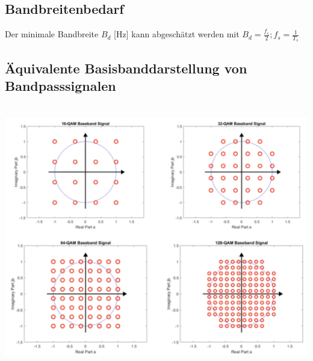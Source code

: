 \subsection{Bandbreitenbedarf}
Der minimale Bandbreite $B_d$ [Hz] kann abgeschätzt werden mit $B_d = \frac{f_s}{2}; f_s = \frac{1}{T_s}$

\subsection{Äquivalente Basisbanddarstellung von Bandpasssignalen} \\
\includegraphics[width=\columnwidth]{Images/qam_basisdarstellung}
